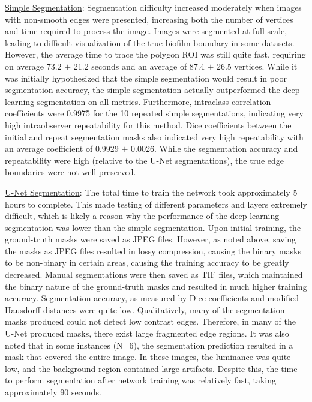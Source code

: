 \documentclass[conference]{IEEEtran}
\begin{document}
\ul{Simple Segmentation}: Segmentation difficulty increased moderately when images with non-smooth edges were presented, increasing both the number of vertices and time required to process the image. Images were segmented at full scale, leading to difficult visualization of the true biofilm boundary in some datasets. However, the average time to trace the polygon ROI was still quite fast, requiring on average 73.2 $\pm$ 21.2 seconds and an average of 87.4 $\pm$ 26.5 vertices. While it was initially hypothesized that the simple segmentation would result in poor segmentation accuracy, the simple segmentation actually outperformed the deep learning segmentation on all metrics. Furthermore, intraclass correlation coefficients were 0.9975 for the 10 repeated simple segmentations, indicating very high intraobserver repeatability for this method. Dice coefficients between the initial and repeat segmentation masks also indicated very high repeatability with an average coefficient of 0.9929 $\pm$
 0.0026. While the segmentation accuracy and repeatability were high (relative to the U-Net segmentations), the true edge boundaries were not well preserved.

\ul{U-Net Segmentation}: The total time to train the network took approximately 5 hours to complete. This made testing of different parameters and layers extremely difficult, which is likely a reason why the performance of the deep learning segmentation was lower than the simple segmentation. Upon initial training, the ground-truth masks were saved as JPEG files. However, as noted above, saving the masks as JPEG files resulted in lossy compression, causing the binary masks to be non-binary in certain areas, causing the training accuracy to be greatly decreased. Manual segmentations were then saved as TIF files, which maintained the binary nature of the ground-truth masks and resulted in much higher training accuracy. Segmentation accuracy, as measured by Dice coefficients and modified Hausdorff distances were quite low. Qualitatively, many of the segmentation masks produced could not detect low contrast edges. Therefore, in many of the U-Net produced masks, there exist large fragmented edge regions. It was also noted that in some instances (N=6), the segmentation prediction resulted in a mask that covered the entire image. In these images, the luminance was quite low, and the background region contained large artifacts. Despite this, the time to perform segmentation after network training was relatively fast, taking approximately 90 seconds.
\end{document}
